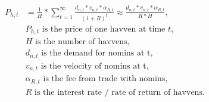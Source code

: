 \begin{align*} 
P_{h,t} &= \frac{1}{H}* \sum\limits_{t=1}^\infty \frac{d_{n,t} *v_{n,t} * \alpha_{R,t}}{(1+R)^t} \approx \frac{d_{n,t} *v_{n,t} * \alpha_{R,t}}{R * H}, \\
& P_{h,t} \text{ is the price of one havven at time } t, \\
& H \text{ is the number of havvens}, \\
& d_{n,t} \text{ is the demand for nomins at t}, \\
& v_{n,t} \text{ is the velocity of nomins at t}, \\
& \alpha_{R,t} \text{ is the fee from trade with nomins}, \\
& R \text{ is the interest rate / rate of return of havvens}. \\
\end{align*}

\newpage